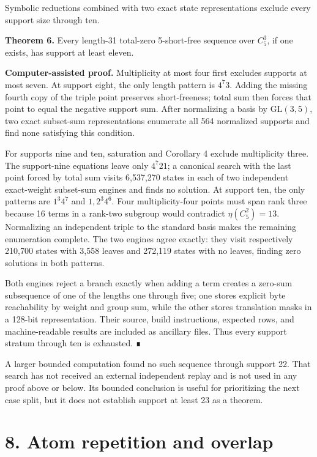 \documentclass[
  11pt,
]{article}
\begin{document}
Symbolic reductions combined with two exact state representations
exclude every support size through ten.

\textbf{Theorem 6.} Every length-31 total-zero 5-short-free sequence
over \(C_5^3\), if one exists, has support at least eleven.

\textbf{Computer-assisted proof.} Multiplicity at most four first
excludes supports at most seven. At support eight, the only length
pattern is \(4^7 3\). Adding the missing fourth copy of the triple point
preserves short-freeness; total sum then forces that point to equal the
negative support sum. After normalizing a basis by \(\mathrm{GL}(3,5)\),
two exact subset-sum representations enumerate all 564 normalized
supports and find none satisfying this condition.

For supports nine and ten, saturation and Corollary 4 exclude
multiplicity three. The support-nine equations leave only \(4^7 2 1\); a
canonical search with the last point forced by total sum visits
6,537,270 states in each of two independent exact-weight subset-sum
engines and finds no solution. At support ten, the only patterns are
\(1^3 4^7\) and \(1,2^3 4^6\). Four multiplicity-four points must span
rank three because 16 terms in a rank-two subgroup would contradict
\(\eta(C_5^2)=13\). Normalizing an independent triple to the standard
basis makes the remaining enumeration complete. The two engines agree
exactly: they visit respectively 210,700 states with 3,558 leaves and
272,119 states with no leaves, finding zero solutions in both patterns.

Both engines reject a branch exactly when adding a term creates a
zero-sum subsequence of one of the lengths one through five; one stores
explicit byte reachability by weight and group sum, while the other
stores translation masks in a 128-bit representation. Their source,
build instructions, expected rows, and machine-readable results are
included as ancillary files. Thus every support stratum through ten is
exhausted. ∎

A larger bounded computation found no such sequence through support 22.
That search has not received an external independent replay and is not
used in any proof above or below. Its bounded conclusion is useful for
prioritizing the next case split, but it does not establish support at
least 23 as a theorem.

\hypertarget{atom-repetition-and-overlap}{%
\section{8. Atom repetition and
overlap}\label{atom-repetition-and-overlap}}
\end{document}
